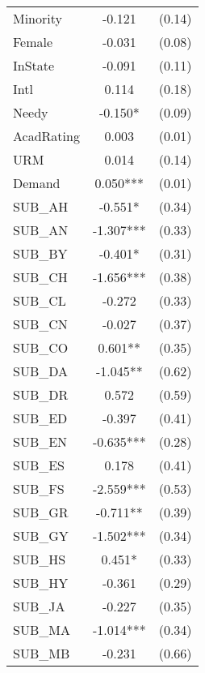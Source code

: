 \begin{table}[htb]
\begin{threeparttable}
\begin{tabular}{l c c}
      Minority         & -0.121    & (0.14)       \\
      Female           & -0.031    & (0.08)       \\
      InState               & -0.091    & (0.11)       \\
      Intl             & 0.114     & (0.18)       \\
      Needy            & -0.150*   & (0.09)       \\
      AcadRating       & 0.003     & (0.01)       \\
      URM              & 0.014     & (0.14)       \\
      Demand           & 0.050***  & (0.01)       \\
      SUB\_AH          & -0.551*   & (0.34)       \\
      SUB\_AN          & -1.307*** & (0.33)       \\
      SUB\_BY          & -0.401*   & (0.31)       \\
      SUB\_CH          & -1.656*** & (0.38)       \\
      SUB\_CL          & -0.272    & (0.33)       \\
      SUB\_CN          & -0.027    & (0.37)       \\
      SUB\_CO          & 0.601**   & (0.35)       \\
      SUB\_DA          & -1.045**  & (0.62)       \\
      SUB\_DR          & 0.572     & (0.59)       \\
      SUB\_ED          & -0.397    & (0.41)       \\
      SUB\_EN          & -0.635*** & (0.28)       \\
      SUB\_ES          & 0.178     & (0.41)       \\
      SUB\_FS          & -2.559*** & (0.53)       \\
      SUB\_GR          & -0.711**  & (0.39)       \\
      SUB\_GY          & -1.502*** & (0.34)       \\
      SUB\_HS          & 0.451*    & (0.33)       \\
      SUB\_HY          & -0.361    & (0.29)       \\
      SUB\_JA          & -0.227    & (0.35)       \\
      SUB\_MA          & -1.014*** & (0.34)       \\
      SUB\_MB          & -0.231    & (0.66)       \\

\end{tabular}
\end{threeparttable}
\end{table}
